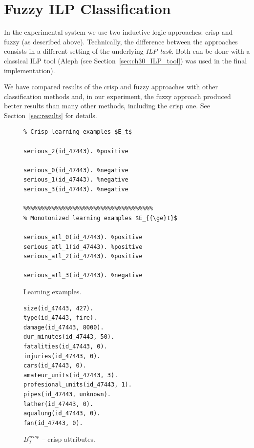 









\section{Fuzzy ILP Classification} \label{sec:implementation}

In the experimental system we use two inductive logic approaches: crisp and fuzzy (as described above). Technically, the difference between the approaches consists in a different setting of the underlying \emph{ILP task}. Both can be done with a classical ILP tool (Aleph (see Section~\ref{sec:ch30_ILP_tool}) was used in the final implementation).

We have compared results of the crisp and fuzzy approaches with other classification methods and, in our experiment, the fuzzy approach produced better results than many other methods, including the crisp one. See Section~\ref{sec:results} for details.



\begin{figure}
\begin{minipage}[b]{0.5\hsize}
\begin{verbatim}
% Crisp learning examples $E_t$

serious_2(id_47443). %positive

serious_0(id_47443). %negative
serious_1(id_47443). %negative
serious_3(id_47443). %negative							

%%%%%%%%%%%%%%%%%%%%%%%%%%%%%%%%%%%%%
% Monotonized learning examples $E_{{\ge}t}$

serious_atl_0(id_47443). %positive
serious_atl_1(id_47443). %positive
serious_atl_2(id_47443). %positive

serious_atl_3(id_47443). %negative					
\end{verbatim}						
	\caption{Learning examples.}
	\label{img:examples}
\end{minipage}
\hspace{0.5cm}
\begin{minipage}[b]{0.5\hsize}
\begin{verbatim}
size(id_47443, 427).
type(id_47443, fire).
damage(id_47443, 8000).
dur_minutes(id_47443, 50).
fatalities(id_47443, 0).
injuries(id_47443, 0).
cars(id_47443, 0).
amateur_units(id_47443, 3).
profesional_units(id_47443, 1).
pipes(id_47443, unknown).
lather(id_47443, 0).
aqualung(id_47443, 0).
fan(id_47443, 0).
\end{verbatim}						
	\caption{$B^{crisp}_{T}$ -- crisp attributes.}
	\label{img:crisp_attributes}
\end{minipage}
\end{figure}






